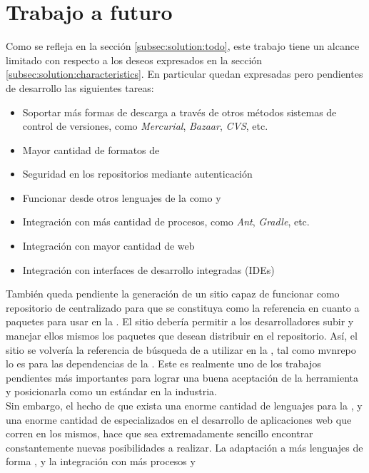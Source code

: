 \section{Trabajo a futuro}

Como se refleja en la sección \ref{subsec:solution:todo}, este trabajo
tiene un alcance limitado con respecto a los deseos expresados en
la sección \ref{subsec:solution:characteristics}. En particular quedan
expresadas pero pendientes de desarrollo las siguientes tareas:
\begin{itemize}
	\setlength{\itemsep}{1pt}
	\setlength{\parskip}{0pt}
	\setlength{\parsep}{0pt}
	\item Soportar más formas de descarga a través de otros métodos sistemas de
		control de versiones, como \emph{Mercurial}, \emph{Bazaar}, \emph{CVS}, etc.
	\item Mayor cantidad de formatos de \conffiles
	\item Seguridad en los repositorios mediante autenticación
	\item Funcionar desde otros lenguajes de la \jvm como \clojure y \groovy
	\item Integración con más cantidad de procesos, como \emph{Ant}, \emph{Gradle}, etc.
	\item Integración con mayor cantidad de \frameworks web
	\item Integración con interfaces de desarrollo integradas (IDEs)
\end{itemize}
También queda pendiente la generación de un sitio capaz de funcionar como
repositorio de \dependencies centralizado para que se constituya como la
referencia en cuanto a paquetes para usar en la \viewtier. El sitio debería
permitir a los desarrolladores subir y manejar ellos mismos los paquetes que
desean distribuir en el repositorio. Así, el sitio se volvería la referencia
de búsqueda de \dependencies a utilizar en la \viewtier, tal como \gls{mvnrepo}
lo es para las dependencias de la \logictier. Este es realmente
uno de los trabajos pendientes más importantes para lograr una buena aceptación
de la herramienta y posicionarla como un estándar en la industria.\\
Sin embargo, el hecho de que exista una enorme cantidad de lenguajes para la 
\jvm, y una enorme cantidad de \frameworks especializados en el desarrollo de
aplicaciones web que corren en los mismos, hace que sea extremadamente sencillo
encontrar constantemente nuevas posibilidades a realizar. La adaptación a más
lenguajes de forma , y la integración con más procesos y

